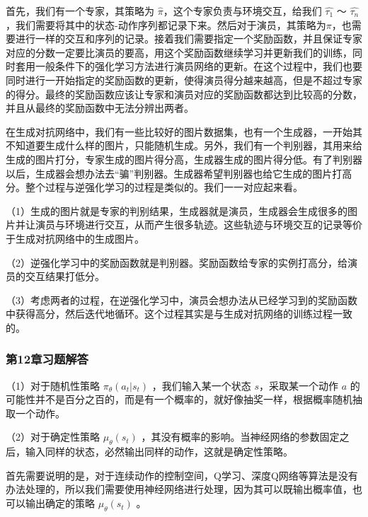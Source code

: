 
首先，我们有一个专家，其策略为 $\hat{\pi}$，这个专家负责与环境交互，给我们 $\hat{\tau_1}$ ～ $\hat{\tau_n}$，我们需要将其中的状态-动作序列都记录下来。然后对于演员，其策略为$\pi$，也需要进行一样的交互和序列的记录。接着我们需要指定一个奖励函数，并且保证专家对应的分数一定要比演员的要高，用这个奖励函数继续学习并更新我们的训练，同时套用一般条件下的强化学习方法进行演员网络的更新。在这个过程中，我们也要同时进行一开始指定的奖励函数的更新，使得演员得分越来越高，但是不超过专家的得分。最终的奖励函数应该让专家和演员对应的奖励函数都达到比较高的分数，并且从最终的奖励函数中无法分辨出两者。


在生成对抗网络中，我们有一些比较好的图片数据集，也有一个生成器，一开始其不知道要生成什么样的图片，只能随机生成。另外，我们有一个判别器，其用来给生成的图片打分，专家生成的图片得分高，生成器生成的图片得分低。有了判别器以后，生成器会想办法去“骗”判别器。生成器希望判别器也给它生成的图片打高分。整个过程与逆强化学习的过程是类似的。我们一一对应起来看。

（1）生成的图片就是专家的判别结果，生成器就是演员，生成器会生成很多的图片并让演员与环境进行交互，从而产生很多轨迹。这些轨迹与环境交互的记录等价于生成对抗网络中的生成图片。

（2）逆强化学习中的奖励函数就是判别器。奖励函数给专家的实例打高分，给演员的交互结果打低分。

（3）考虑两者的过程，在逆强化学习中，演员会想办法从已经学习到的奖励函数中获得高分，然后迭代地循环。这个过程其实是与生成对抗网络的训练过程一致的。



\subsubsection*{第12章习题解答}


（1）对于随机性策略 $\pi_\theta(a_t|s_t)$ ，我们输入某一个状态 $s$，采取某一个动作 $a$ 的可能性并不是百分之百的，而是有一个概率的，就好像抽奖一样，根据概率随机抽取一个动作。

（2）对于确定性策略 $\mu_{\theta}(s_t)$ ，其没有概率的影响。当神经网络的参数固定之后，输入同样的状态，必然输出同样的动作，这就是确定性策略。


首先需要说明的是，对于连续动作的控制空间，Q学习、深度Q网络等算法是没有办法处理的，所以我们需要使用神经网络进行处理，因为其可以既输出概率值，也可以输出确定的策略 $\mu_{\theta}(s_t)$ 。

